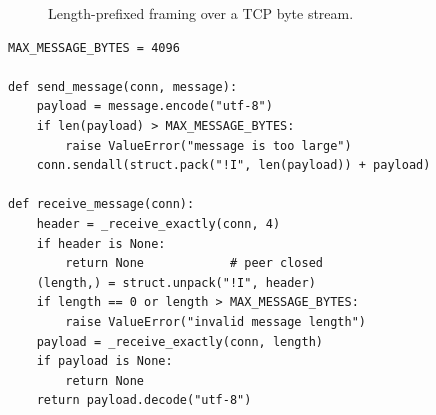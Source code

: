 \documentclass[conference]{IEEEtran}
\begin{document}
\begin{figure}[t]
\centering
{}
\caption{Length-prefixed framing over a TCP byte stream.}
\label{fig:framing}
\end{figure}

\begin{lstlisting}[caption={Framing logic of the reference implementation (\texttt{protocol.py}, condensed).},label={lst:frame},float=t]
MAX_MESSAGE_BYTES = 4096

def send_message(conn, message):
    payload = message.encode("utf-8")
    if len(payload) > MAX_MESSAGE_BYTES:
        raise ValueError("message is too large")
    conn.sendall(struct.pack("!I", len(payload)) + payload)

def receive_message(conn):
    header = _receive_exactly(conn, 4)
    if header is None:
        return None            # peer closed
    (length,) = struct.unpack("!I", header)
    if length == 0 or length > MAX_MESSAGE_BYTES:
        raise ValueError("invalid message length")
    payload = _receive_exactly(conn, length)
    if payload is None:
        return None
    return payload.decode("utf-8")
\end{lstlisting}
\end{document}
